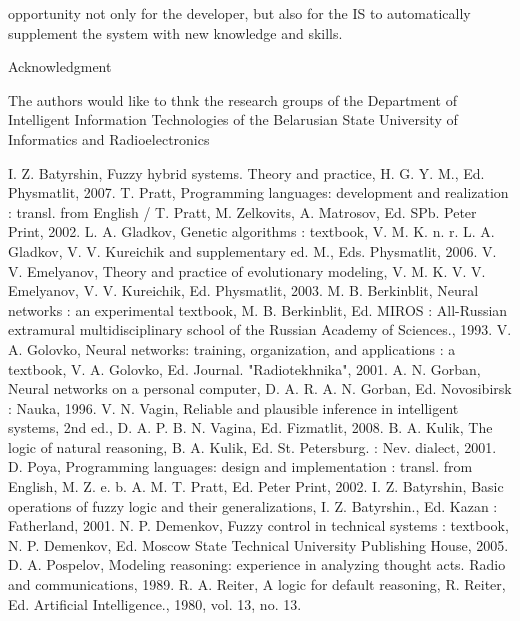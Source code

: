 \documentclass[10pt,a4paper,twocolumn]{article}
\begin{document}
opportunity not only for the developer, but also for the
IS to automatically supplement the system with new
knowledge and skills.
\vspace{0.2cm}
\par \hspace{2.5cm} Acknowledgment
\vspace{0.2cm}
\par The authors would like to thnk the research groups of
the Department of Intelligent Information Technologies
of the Belarusian State University of Informatics and Radioelectronics
\vspace{-0.5cm}
\begin{thebibliography}{196}
\setlength{\itemsep}{0pt}
\setlength{\parskip}{0pt}
\footnotesize{
\bibitem  I. Z. Batyrshin, Fuzzy hybrid systems. Theory and practice,
H. G. Y. M., Ed. Physmatlit, 2007.
\bibitem T. Pratt, Programming languages: development and realization
: transl. from English / T. Pratt, M. Zelkovits, A. Matrosov, Ed.
SPb. Peter Print, 2002.
\bibitem L. A. Gladkov, Genetic algorithms : textbook, V. M. K. n. r.
L. A. Gladkov, V. V. Kureichik and supplementary ed. M., Eds.
Physmatlit, 2006.
\bibitem V. V. Emelyanov, Theory and practice of evolutionary modeling,
V. M. K. V. V. Emelyanov, V. V. Kureichik, Ed. Physmatlit,
2003.
\bibitem M. B. Berkinblit, Neural networks : an experimental textbook,
M. B. Berkinblit, Ed. MIROS : All-Russian extramural multidisciplinary school of the Russian Academy of Sciences., 1993.
\bibitem V. A. Golovko, Neural networks: training, organization, and
applications : a textbook, V. A. Golovko, Ed. Journal. "Radiotekhnika", 2001.
\bibitem A. N. Gorban, Neural networks on a personal computer, D. A. R.
A. N. Gorban, Ed. Novosibirsk : Nauka, 1996.
\bibitem V. N. Vagin, Reliable and plausible inference in intelligent
systems, 2nd ed., D. A. P. B. N. Vagina, Ed. Fizmatlit, 2008.
\bibitem B. A. Kulik, The logic of natural reasoning, B. A. Kulik, Ed. St.
Petersburg. : Nev. dialect, 2001.
\bibitem D. Poya, Programming languages: design and implementation :
transl. from English, M. Z. e. b. A. M. T. Pratt, Ed. Peter Print,
2002.
\bibitem I. Z. Batyrshin, Basic operations of fuzzy logic and their
generalizations, I. Z. Batyrshin., Ed. Kazan : Fatherland, 2001.
\bibitem N. P. Demenkov, Fuzzy control in technical systems : textbook,
N. P. Demenkov, Ed. Moscow State Technical University
Publishing House, 2005.
\bibitem D. A. Pospelov, Modeling reasoning: experience in analyzing
thought acts. Radio and communications, 1989.
\bibitem R. A. Reiter, A logic for default reasoning, R. Reiter, Ed. Artificial Intelligence., 1980, vol. 13, no. 13.
}
\end{thebibliography}
\end{document}
